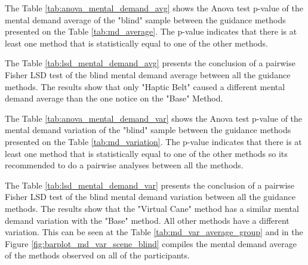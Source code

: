 

The Table \ref{tab:anova_mental_demand_avg} shows the Anova test p-value of the mental demand average of the "blind" sample between the guidance methods presented on the Table \ref{tab:md_average}. The p-value indicates that there is at least one method that is statistically equal to one of the other methods.



The Table \ref{tab:lsd_mental_demand_avg} presents the conclusion of a pairwise Fisher LSD test of the blind mental demand average between all the guidance methods. The results show that only "Haptic Belt" caused a different mental demand average than the one notice on the "Base" Method.



The Table \ref{tab:anova_mental_demand_var} shows the Anova test p-value of the mental demand variation of the "blind" sample between the guidance methods presented on the Table \ref{tab:md_variation}. The p-value indicates that there is at least one method that is statistically equal to one of the other methods so its recommended to do a pairwise analyses between all the methods.





The Table \ref{tab:lsd_mental_demand_var} presents the conclusion of a pairwise Fisher LSD test of the blind mental demand variation between all the guidance methods. The results show that the "Virtual Cane" method has a similar mental demand variation with the "Base" method. All other methods have a different variation. This can be seen at the Table \ref{tab:md_var_average_group} and in the Figure \ref{fig:barplot_md_var_scene_blind} compiles the mental demand average of the methods observed on all of the participants.





